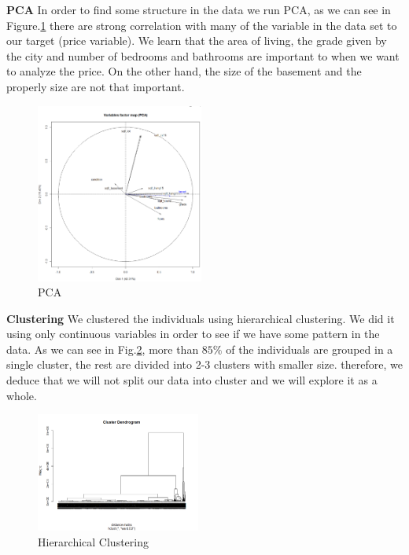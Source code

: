 \begin{multicols}{2}

\textbf{PCA} In order to find some structure in the data we run PCA, as we can see in Figure.\ref{fig:PCA} there are strong correlation with many of the variable in the data set to our target (price variable). We learn that the area of living, the grade given by the city and number of bedrooms and bathrooms are important to when we want to analyze the price. On the other hand, the size of the basement and the properly size are not that important. 

\begin{figure}[H]
\centering
\includegraphics[width=0.49\textwidth]{img/PCA.png}
\caption{PCA}
\label{fig:PCA}
\end{figure}

\textbf{Clustering}
We clustered the individuals using hierarchical clustering. We did it using only continuous variables in order to see if we have some pattern in the data. As we can see in Fig.\ref{fig:hcluster}, more than $85\%$ of the individuals are grouped in a single cluster, the rest are divided into 2-3 clusters with smaller size. therefore, we deduce that we will not split our data into cluster and we will explore it as a whole.
\begin{figure}[H]
\centering
\includegraphics[width=0.48\textwidth]{img/Hclustering.png}
\caption{Hierarchical Clustering}
\label{fig:hcluster}
\end{figure}
\end{multicols}



